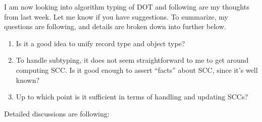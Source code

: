 \documentclass{article}
\begin{document}
I am now looking into algorithm typing of DOT and following are my thoughts from last
week. Let me know if you have suggestions. To summarize, my questions are following,
and details are broken down into further below.

\begin{enumerate}
\item Is it a good idea to unify record type and object type?
\item To handle subtyping, it does not seem straightforward to me to get around
  computing SCC. Is it good enough to assert ``facts'' about SCC, since it's well
  known? 
\item Up to which point is it sufficient in terms of handling and updating SCCs?
\end{enumerate}

Detailed discussions are following:
\end{document}
